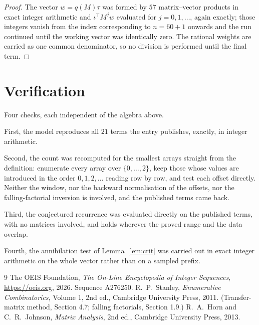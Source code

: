 \documentclass[11pt,a4paper]{article}
\theoremstyle{plain}
\theoremstyle{definition}
\begin{document}
\begin{proof}
The vector $w=q(M)\tau$ was formed by $57$ matrix--vector products in exact integer
arithmetic and $\iota^{\!\top}M^{j}w$ evaluated for $j=0,1,\dots$, again exactly; those
integers vanish from the index corresponding to $n=60+1$ onwards and the run continued
until the working vector was identically zero. The rational weights are carried as one common
denominator, so no division is performed until the final term.
\end{proof}

\section{Verification}

Four checks, each independent of the algebra above.

First, the model reproduces all $21$ terms the entry publishes, exactly, in integer
arithmetic.

Second, the count was recomputed for the smallest arrays straight from the definition:
enumerate every array over $\{0,\dots,2\}$, keep those whose values are introduced in the
order $0,1,2,\dots$ reading row by row, and test each offset directly. Neither the window, nor
the backward normalisation of the offsets, nor the falling-factorial inversion is involved, and
the published terms came back.

Third, the conjectured recurrence was evaluated directly on the published terms, with no
matrices involved, and holds wherever the proved range and the data overlap.

Fourth, the annihilation test of Lemma~\ref{lem:crit} was carried out in exact integer
arithmetic on the whole vector rather than on a sampled prefix.

\begin{thebibliography}{9}
 The OEIS Foundation, \emph{The On-Line Encyclopedia of Integer
Sequences}, \url{https://oeis.org}, 2026. Sequence A276250.
 R.~P.~Stanley, \emph{Enumerative Combinatorics}, Volume 1, 2nd ed.,
Cambridge University Press, 2011. (Transfer-matrix method, Section 4.7; falling factorials,
Section 1.9.)
 R.~A.~Horn and C.~R.~Johnson, \emph{Matrix Analysis}, 2nd ed., Cambridge
University Press, 2013.
\end{thebibliography}
\end{document}
